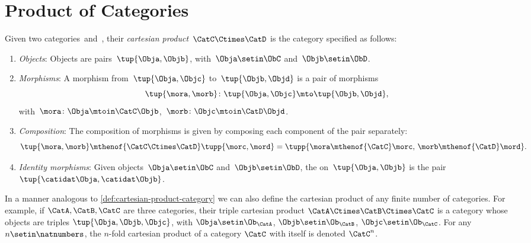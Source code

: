 
\section{Product of Categories}

\begin{ctdefinition}
    \label{def:cartesian-product-category}
    Given two categories~\CatC and~\CatD, their \emph{cartesian product}~$\CatC \Ctimes \CatD$ is the category specified as follows:
    \begin{enumerate}
        \item \emph{Objects}: Objects are pairs~$\tup{\Obja,\Objb}$, with~$\Obja\setin \ObC$ and~$\Objb\setin \ObD$.
        \item \emph{Morphisms}: A morphism from~$\tup{\Obja, \Objc}$ to~$\tup{\Objb,\Objd}$ is a pair of morphisms
              \begin{equation}\label{eq:prod-cat-morphisms}
                  \tup{\mora,\morb} \colon \tup{\Obja,\Objc}\mto \tup{\Objb,\Objd},
              \end{equation}
              with~$\mora\colon \Obja \mtoin\CatC \Objb$,~$\morb\colon \Objc\mtoin\CatD \Objd$.
        \item \emph{Composition}: The composition of morphisms is given by composing each component of the pair separately:
              \begin{equation}
                  \tup{\mora,\morb}\mthenof{\CatC\Ctimes\CatD} \tupp{\morc,\mord}=\tupp{\mora\mthenof{\CatC}\morc,\, \morb \mthenof{\CatD} \mord}.
              \end{equation}
        \item \emph{Identity morphisms}: Given objects~$\Obja\setin \ObC$ and~$\Objb\setin \ObD$, the  on~$\tup{\Obja,\Objb}$ is the pair $\tup{\catidat\Obja,\catidat\Objb}$.
    \end{enumerate}
\end{ctdefinition}

\begin{remark}\label{rem:n-fold-cart-products-of-cats}
    In a manner analogous to \cref{def:cartesian-product-category} we can also define the cartesian product of any finite number of categories.
    For example, if $\CatA, \CatB, \CatC$ are three categories, their triple cartesian product $\CatA \Ctimes \CatB \Ctimes \CatC$ is a category whose objects are triples $\tup{\Obja, \Objb, \Objc}$, with $\Obja\setin \Ob_\CatA$, $\Objb\setin \Ob_\CatB$, $\Objc\setin \Ob_\CatC$.
    For any $n \setin \natnumbers$, the $n$-fold cartesian product of a category $\CatC$ with itself is denoted $\CatC^n$.
\end{remark}

